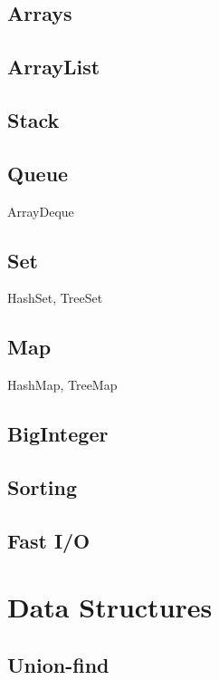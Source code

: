 \documentclass[10pt]{article}
\begin{document}
\subsection{Arrays}

\subsection{ArrayList}

\subsection{Stack}

\subsection{Queue}

ArrayDeque

\subsection{Set}

HashSet, TreeSet

\subsection{Map}

HashMap, TreeMap

\subsection{BigInteger}

\subsection{Sorting}

\subsection{Fast I/O} \label{sec:fastio}

\section{Data Structures}

\subsection{Union-find}
\end{document}
